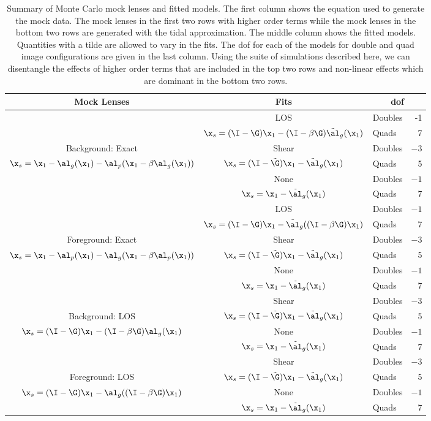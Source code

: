 \begin{table*}
\begin{tabular}{|c| c | l r |}
\hline
Mock Lenses & Fits & \multicolumn{2}{|c|}{dof} \\
\hline

& LOS & Doubles & -1 \\
&$\x_s = (\I-\G)\x_1 - (\I-\beta\G)\tilde{\al}_g(\x_1)$ & Quads &7 \\
 Background: Exact&Shear & Doubles & $-3$ \\
$\x_s = \x_1 - \al_g(\x_1) - \al_p(\x_1-\beta\al_g(\x_1))$&$\x_s = (\I-{\tilde\G})\x_1 - \tilde{\al}_g(\x_1)$&Quads& 5\\
&None&Doubles&$-1$\\
&$\x_s = \x_1 - \tilde{\al}_g(\x_1)$&Quads&7\\
\hline
&LOS & Doubles & $-1$ \\
&$\x_s = (\I-\G)\x_1 - \tilde{\al}_g((\I-\beta\G)\x_1)$ & Quads &7 \\
Foreground: Exact & Shear & Doubles & $-3$ \\
$\x_s = \x_1 - \al_p(\x_1) - \al_g(\x_1-\beta\al_p(\x_1))$&$\x_s = (\I-{\tilde\G})\x_1 - \tilde{\al}_g(\x_1)$&Quads& 5\\
&None&Doubles&$-1$\\
&$\x_s = \x_1 - \tilde{\al}_g(\x_1)$&Quads&7\\
\hline

&Shear & Doubles & $-3$ \\
Background: LOS&$\x_s = (\I-{\tilde\G})\x_1 - \tilde{\al}_g(\x_1)$&Quads& 5\\
 $\x_s = (\I-\G)\x_1 - (\I-\beta\G)\al_g(\x_1)$ &None&Doubles&$-1$\\
&$\x_s = \x_1 - \tilde{\al}_g(\x_1)$&Quads&7\\
\hline
& Shear & Doubles & $-3$ \\
Foreground: LOS&$\x_s = (\I-{\tilde\G})\x_1 - \tilde{\al}_g(\x_1)$&Quads& 5\\
$\x_s = (\I-\G)\x_1 - \al_g((\I-\beta\G)\x_1)$&None&Doubles&$-1$\\
&$\x_s = \x_1 - \tilde{\al}_g(\x_1)$&Quads&7\\
\hline
\end{tabular}
\caption[Summary of Monte Carlo mock lenses and fitted models]{Summary of Monte Carlo mock lenses and fitted models. The first column shows the equation used to generate the mock data. The mock lenses in the first two rows with higher order terms while the mock lenses in the bottom two rows are generated with the tidal approximation. The middle column shows the fitted models. Quantities with a tilde are allowed to vary in the fits. The dof for each of the models for double and quad image configurations are given in the last column. Using the suite of simulations described here, we can disentangle the effects of higher order terms that are included in the top two rows and non-linear effects which are dominant in the bottom two rows. }
\label{tab:models}
\end{table*}